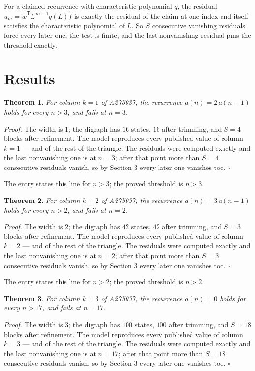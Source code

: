 \documentclass[11pt]{article}
\newtheorem{theorem}{Theorem}
\theoremstyle{definition}
\begin{document}
For a claimed recurrence with characteristic polynomial $q$, the residual $u_m = \tilde w^{\mathsf T}L^{\,m-1}q(L)\tilde f$ is exactly the residual of the claim at one index and itself satisfies the characteristic polynomial of $L$. So $S$ consecutive vanishing residuals force every later one, the test is finite, and the last nonvanishing residual pins the threshold exactly.

\section{Results}

\begin{theorem} For column $k = 1$ of A275037, the recurrence $a(n) = 2\,a(n-1)$ holds for every $n > 3$, and fails at $n = 3$.\end{theorem}

{\itshape Proof.} The width is $1$; the digraph has $16$ states, $16$ after trimming, and $S = 4$ blocks after refinement. The model reproduces every published value of column $k = 1$ --- and of the rest of the triangle. The residuals were computed exactly and the last nonvanishing one is at $n = 3$; after that point more than $S = 4$ consecutive residuals vanish, so by Section 3 every later one vanishes too. $\square$

The entry states this line for $n > 3$; the proved threshold is $n > 3$.

\begin{theorem} For column $k = 2$ of A275037, the recurrence $a(n) = 3\,a(n-1)$ holds for every $n > 2$, and fails at $n = 2$.\end{theorem}

{\itshape Proof.} The width is $2$; the digraph has $42$ states, $42$ after trimming, and $S = 3$ blocks after refinement. The model reproduces every published value of column $k = 2$ --- and of the rest of the triangle. The residuals were computed exactly and the last nonvanishing one is at $n = 2$; after that point more than $S = 3$ consecutive residuals vanish, so by Section 3 every later one vanishes too. $\square$

The entry states this line for $n > 2$; the proved threshold is $n > 2$.

\begin{theorem} For column $k = 3$ of A275037, the recurrence $a(n) = 0$ holds for every $n > 17$, and fails at $n = 17$.\end{theorem}

{\itshape Proof.} The width is $3$; the digraph has $100$ states, $100$ after trimming, and $S = 18$ blocks after refinement. The model reproduces every published value of column $k = 3$ --- and of the rest of the triangle. The residuals were computed exactly and the last nonvanishing one is at $n = 17$; after that point more than $S = 18$ consecutive residuals vanish, so by Section 3 every later one vanishes too. $\square$
\end{document}
